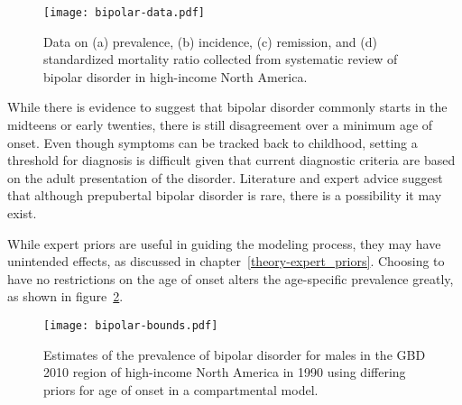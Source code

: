     \begin{figure}[h]
        \begin{center}
            \texttt{[image: bipolar-data.pdf]}
            \caption[Systematic review data for bipolar disorder.]{Data on
            (a) prevalence, (b) incidence, (c) remission, and
              (d) standardized mortality ratio collected from systematic review
              of bipolar disorder in high-income
              North America.}
            \label{fig:app-bipolar data}
        \end{center}
    \end{figure}

While there is evidence to suggest that bipolar disorder commonly
starts in the midteens or early twenties, there is still disagreement
over a minimum age of onset.  Even though symptoms can be tracked back
to childhood, setting a threshold for diagnosis is difficult given
that current diagnostic criteria are based on the adult presentation of
the disorder.  Literature and expert advice suggest that although
prepubertal bipolar disorder is rare, there is a possibility it may
exist. \cite{kloos_bipolar_2011, angst_historical_2000}

While expert priors are useful in guiding the modeling process, they
may have unintended effects, as discussed in chapter~\ref{theory-expert_priors}.
Choosing to have no restrictions on the
age of onset alters the age-specific prevalence greatly, as shown in
figure~\ref{fig:app-bipolar bounds}.

    \begin{figure}[h]
        \begin{center}
            \texttt{[image: bipolar-bounds.pdf]}
            \caption[Comparison of prevalence estimates for bipolar disorder
              using differing priors for the age of onset in a compartmental
              modle.]{Estimates of the prevalence of bipolar disorder
              for males in the GBD 2010 region of high-income North America 
              in 1990 using differing priors for age of onset
              in a compartmental model.}
            \label{fig:app-bipolar bounds}
        \end{center}
    \end{figure}

